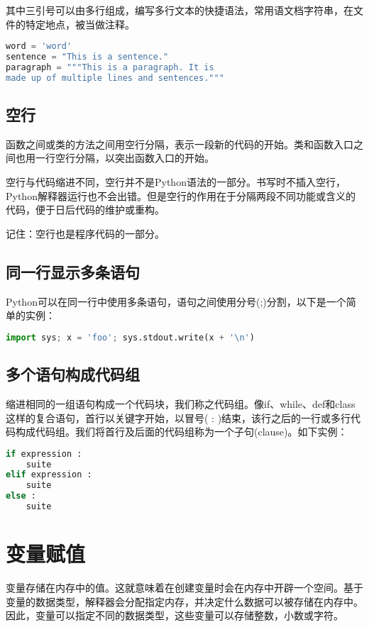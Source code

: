 其中三引号可以由多行组成，编写多行文本的快捷语法，常用语文档字符串，在文件的特定地点，被当做注释。
\begin{lstlisting}[language=Python]
word = 'word'
sentence = "This is a sentence."
paragraph = """This is a paragraph. It is
made up of multiple lines and sentences."""
\end{lstlisting}



\subsection{空行}
函数之间或类的方法之间用空行分隔，表示一段新的代码的开始。类和函数入口之间也用一行空行分隔，以突出函数入口的开始。

空行与代码缩进不同，空行并不是Python语法的一部分。书写时不插入空行，Python解释器运行也不会出错。但是空行的作用在于分隔两段不同功能或含义的代码，便于日后代码的维护或重构。

记住：空行也是程序代码的一部分。



\subsection{同一行显示多条语句}
Python可以在同一行中使用多条语句，语句之间使用分号(;)分割，以下是一个简单的实例：
\begin{lstlisting}[language=Python]
import sys; x = 'foo'; sys.stdout.write(x + '\n')
\end{lstlisting}



\subsection{多个语句构成代码组}
缩进相同的一组语句构成一个代码块，我们称之代码组。像if、while、def和class这样的复合语句，首行以关键字开始，以冒号( : )结束，该行之后的一行或多行代码构成代码组。我们将首行及后面的代码组称为一个子句(clause)。如下实例：
\begin{lstlisting}[language=Python]
if expression : 
    suite 
elif expression :  
    suite  
else :  
    suite 
\end{lstlisting}



\section{变量赋值}
变量存储在内存中的值。这就意味着在创建变量时会在内存中开辟一个空间。基于变量的数据类型，解释器会分配指定内存，并决定什么数据可以被存储在内存中。因此，变量可以指定不同的数据类型，这些变量可以存储整数，小数或字符。

